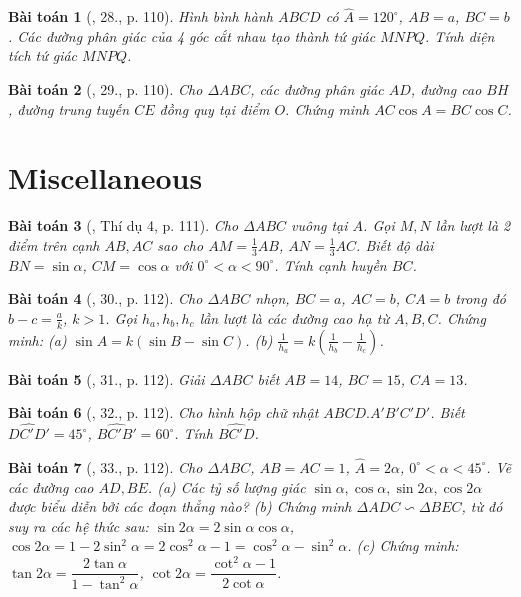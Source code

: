 \documentclass{article}
\newtheorem{baitoan}{Bài toán}
\begin{document}
\begin{baitoan}[\cite{Tuyen_Toan_9}, 28., p. 110]
	Hình bình hành $ABCD$ có $\widehat{A} = 120^\circ$, $AB = a$, $BC = b$. Các đường phân giác của 4 góc cắt nhau tạo thành tứ giác $MNPQ$. Tính diện tích tứ giác $MNPQ$.
\end{baitoan}

\begin{baitoan}[\cite{Tuyen_Toan_9}, 29., p. 110]
	Cho $\Delta ABC$, các đường phân giác $AD$, đường cao $BH$, đường trung tuyến $CE$ đồng quy tại điểm $O$. Chứng minh $AC\cos A = BC\cos C$.
\end{baitoan}


\section{Miscellaneous}

\begin{baitoan}[\cite{Tuyen_Toan_9}, Thí dụ 4, p. 111]
	Cho $\Delta ABC$ vuông tại $A$. Gọi $M,N$ lần lượt là 2 điểm trên cạnh $AB,AC$ sao cho $AM = \frac{1}{3}AB$, $AN = \frac{1}{3}AC$. Biết độ dài $BN = \sin\alpha$, $CM = \cos\alpha$ với $0^\circ < \alpha < 90^\circ$. Tính cạnh huyền $BC$.
\end{baitoan}

\begin{baitoan}[\cite{Tuyen_Toan_9}, 30., p. 112]
	Cho $\Delta ABC$ nhọn, $BC = a$, $AC = b$, $CA = b$ trong đó $b - c = \frac{a}{k}$, $k > 1$. Gọi $h_a,h_b,h_c$ lần lượt là các đường cao hạ từ $A,B,C$. Chứng minh: (a) $\sin A = k(\sin B - \sin C)$. (b) $\frac{1}{h_a} = k\left(\frac{1}{h_b} - \frac{1}{h_c}\right)$.
\end{baitoan}

\begin{baitoan}[\cite{Tuyen_Toan_9}, 31., p. 112]
	Giải $\Delta ABC$ biết $AB = 14$, $BC = 15$, $CA = 13$.
\end{baitoan}

\begin{baitoan}[\cite{Tuyen_Toan_9}, 32., p. 112]
	Cho hình hộp chữ nhật $ABCD.A'B'C'D'$. Biết $\widehat{DC'D'} = 45^\circ$, $\widehat{BC'B'} = 60^\circ$. Tính $\widehat{BC'D}$.
\end{baitoan}

\begin{baitoan}[\cite{Tuyen_Toan_9}, 33., p. 112]
	Cho $\Delta ABC$, $AB = AC = 1$, $\widehat{A} = 2\alpha$, $0^\circ < \alpha < 45^\circ$. Vẽ các đường cao $AD,BE$. (a) Các tỷ số lượng giác $\sin\alpha,\cos\alpha,\sin2\alpha,\cos2\alpha$ được biểu diễn bởi các đoạn thẳng nào? (b) Chứng minh $\Delta ADC\backsim\Delta BEC$, từ đó suy ra các hệ thức sau: $\sin2\alpha = 2\sin\alpha\cos\alpha$, $\cos2\alpha = 1 - 2\sin^2\alpha = 2\cos^2\alpha - 1 = \cos^2\alpha - \sin^2\alpha$. (c) Chứng minh: $\tan2\alpha = \dfrac{2\tan\alpha}{1 - \tan^2\alpha}$, $\cot2\alpha = \dfrac{\cot^2\alpha - 1}{2\cot\alpha}$.
\end{baitoan}
\end{document}
